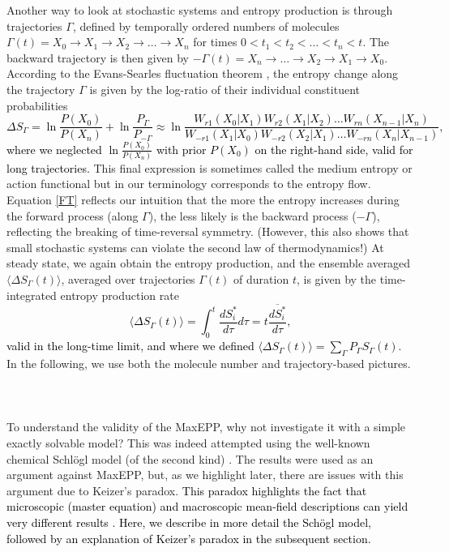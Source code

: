 \documentclass[aps,prl,reprint,singlecolumn,superscriptaddress]{revtex4}
\begin{document}
Another way to look at stochastic systems and entropy production is through trajectories $\Gamma$, defined by temporally ordered 
numbers of molecules $\Gamma(t)=X_0\rightarrow X_1\rightarrow X_2\rightarrow\dots\rightarrow X_n$ for times $0<t_1<t_2<\dots<t_n<t$. The
backward trajectory is then given by $-\Gamma(t)=X_n\rightarrow\dots\rightarrow X_2\rightarrow X_1\rightarrow X_0$. According to the
Evans-Searles fluctuation theorem \cite{seifert12}, the entropy change along the trajectory $\Gamma$ is given by the log-ratio of their 
individual constituent probabilities
\textcolor{black}{\begin{equation}
\Delta S_\Gamma=\ln\frac{P(X_0)}{P(X_n)}+\ln\frac{P_\Gamma}{P_{-\Gamma}}\approx\ln\frac{W_{r1}(X_0|X_1)W_{r2}(X_1|X_2)\dots W_{rn}(X_{n-1}|X_n)}
{W_{-r1}(X_1|X_0)W_{-r2}(X_2|X_1)\dots W_{-rn}(X_{n}|X_{n-1})},\label{FT}
\end{equation}
where we neglected $\ln\frac{P(X_0)}{P(X_n)}$ with prior $P(X_0)$ on the right-hand side, valid for long trajectories.} This final expression 
is sometimes called the medium entropy \cite{seifert12} or action functional \cite{lebowitz99,gaspard04}
but in our terminology corresponds to the entropy flow. Equation \ref{FT} reflects our intuition that
the more the entropy increases during the forward process (along $\Gamma$), the less likely is the backward process ($-\Gamma$), 
reflecting the breaking of time-reversal symmetry.
(However, this also shows that small stochastic systems can violate the second law of thermodynamics!) At steady state, we again obtain the 
entropy production, and the ensemble averaged $\langle\Delta S_\Gamma(t)\rangle$, averaged over trajectories $\Gamma(t)$ of duration $t$, 
is given by the time-integrated entropy production rate \cite{gaspard04}
\textcolor{black}{\begin{equation}
\langle\Delta S_\Gamma(t)\rangle=\int_0^t\frac{dS_{i}^*}{d\tau}d\tau=t\overline{\frac{dS_i^*}{d\tau}},
\end{equation}
valid in the long-time limit, and where we defined $\langle\Delta S_\Gamma(t)\rangle=\sum_{\Gamma}P_{\Gamma}S_{\Gamma}(t)$}. 
In the following, we use both the molecule number and trajectory-based pictures.
\ \\
\ \\
\\
To understand the validity of the MaxEPP, why not investigate it with a simple exactly solvable model? This was indeed attempted using 
the well-known chemical Schl\"ogl model {(of the second kind) \cite{schloegl72,vellela09}}. The results were used as an 
argument against MaxEPP, but, as we highlight later, there are issues with this argument due to Keizer's paradox.
\textcolor{black}{This paradox highlights the fact that microscopic (master equation) and macroscopic mean-field descriptions can yield 
very different results \cite{kurtz71,kurtz72,vellela07}. Here, we describe in more detail the Sch\"ogl model, followed by an
explanation of Keizer's paradox in the subsequent section.}
\end{document}

